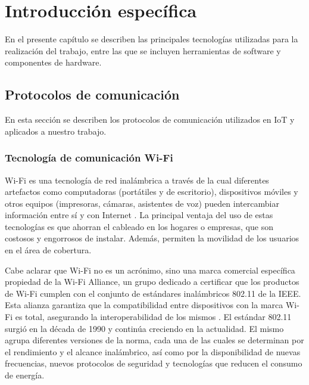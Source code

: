 \chapter{Introducción específica} %

\label{Chapter2}


En el presente capítulo se describen las principales tecnologías utilizadas para la realización del trabajo, entre las que se incluyen herramientas de software y componentes de hardware.

\section{Protocolos de comunicación}

En esta sección se describen los protocolos de comunicación utilizados en IoT y aplicados a nuestro trabajo.


\subsection{Tecnología de comunicación Wi-Fi}
Wi-Fi es una tecnología de red inalámbrica a través de la cual diferentes artefactos como computadoras (portátiles y de escritorio), dispositivos móviles y otros equipos (impresoras, cámaras, asistentes de voz) pueden intercambiar información entre sí y con Internet \citep{WEBSITE:WifiCisco}. La principal ventaja del uso de estas tecnologías es que ahorran el cableado en los hogares o empresas, que son costosos y engorrosos de instalar. Además, permiten la movilidad de los usuarios en el área de cobertura. 

Cabe aclarar que Wi-Fi no es un acrónimo, sino una marca comercial específica propiedad de la Wi-Fi Alliance, un grupo dedicado a certificar que los productos de Wi-Fi cumplen con el conjunto de estándares inalámbricos 802.11 de la IEEE. Esta alianza garantiza que la compatibilidad entre dispositivos con la marca Wi-Fi es total, asegurando la interoperabilidad de los mismos \citep{WEBSITE:WifiEstandar}. El estándar 802.11 surgió en la década de 1990 y continúa creciendo en la actualidad. El mismo agrupa diferentes versiones de la norma,  cada una de las cuales se determinan por el rendimiento y el alcance inalámbrico, así como por la disponibilidad de nuevas frecuencias, nuevos protocolos de seguridad y tecnologías que reducen el consumo de energía.

